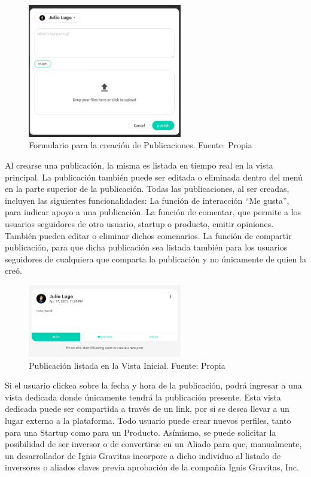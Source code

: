\begin{figure}[H]
\centering
\includegraphics[width=0.60\textwidth]{img/34.png}
\caption{Formulario para la creación de Publicaciones. Fuente: Propia}
\label{figure:postsCreationForm}
\end{figure}


Al crearse una publicación, la misma es listada en tiempo real en la vista principal. La publicación también puede ser editada o eliminada dentro del menú en la parte superior de la publicación. Todas las publicaciones, al ser creadas, incluyen las siguientes funcionalidades:
La función de interacción “Me gusta”, para indicar apoyo a una publicación.
La función de comentar, que permite a los usuarios seguidores de otro usuario, startup o producto, emitir opiniones. También pueden editar o eliminar dichos comenarios.
La función de compartir publicación, para que dicha publicación sea listada también para los usuarios seguidores de cualquiera que comparta la publicación y no únicamente de quien la creó.

\begin{figure}[H]
\centering
\includegraphics[width=0.60\textwidth]{img/35.png}
\caption{
Publicación listada en la Vista Inicial. Fuente: Propia}
\label{figure:homeViewPost}
\end{figure}

Si el usuario clickea sobre la fecha y hora de la publicación, podrá ingresar a una vista dedicada donde únicamente tendrá la publicación presente. Esta vista dedicada puede ser compartida a través de un link, por si se desea llevar a un lugar externo a la plataforma. Todo usuario puede crear nuevos perfiles, tanto para una Startup como para un Producto.  Asímismo, se puede solicitar la posibilidad de ser inversor o de convertirse en un Aliado para que, manualmente, un desarrollador de Ignis Gravitas incorpore a dicho individuo al listado de inversores o aliados claves previa aprobación de la compañía Ignis Gravitas, Inc.

